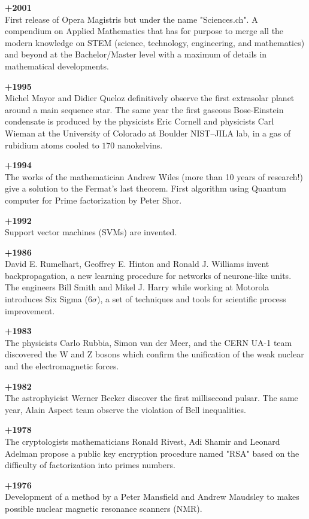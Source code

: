 \textbf{+2001}\\
First release of Opera Magistris but under the name "Sciences.ch". A compendium on Applied Mathematics that has for purpose to merge all the modern knowledge on STEM (science, technology, engineering, and mathematics) and beyond at the Bachelor/Master level with a maximum of details in mathematical developments.

\textbf{+1995}\\
Michel Mayor and Didier Queloz definitively observe the first extrasolar planet around a main sequence star. The same year the first gaseous Bose-Einstein condensate is produced by the physicists Eric Cornell and physicists Carl Wieman at the University of Colorado at Boulder NIST–JILA lab, in a gas of rubidium atoms cooled to $170$ nanokelvins.

\textbf{+1994}\\
The works of the mathematician Andrew Wiles (more than 10 years of research!) give a solution to the Fermat's last theorem. First algorithm using Quantum computer for Prime factorization by Peter Shor.

\textbf{+1992}\\
Support vector machines (SVMs) are invented.

\textbf{+1986}\\
David E. Rumelhart, Geoffrey E. Hinton and Ronald J. Williams invent backpropagation, a new learning procedure for networks of neurone-like units. The engineers Bill Smith and Mikel J. Harry while working at Motorola introduces Six Sigma ($6\sigma$), a set of techniques and tools for scientific process improvement.

\textbf{+1983}\\
The physicists Carlo Rubbia, Simon van der Meer, and the CERN UA-1 team discovered the W and Z bosons which confirm the unification of the weak nuclear and the electromagnetic forces.

\textbf{+1982}\\
The astrophyicist Werner Becker discover the first millisecond pulsar. The same year, Alain Aspect team observe the violation of Bell inequalities.

\textbf{+1978}\\
The cryptologists mathematicians Ronald Rivest, Adi Shamir and Leonard Adelman propose a public key encryption procedure named "RSA" based on the difficulty of factorization into primes numbers.

\textbf{+1976}\\
Development of a method by a Peter Mansfield and Andrew Maudsley to makes possible nuclear magnetic resonance scanners (NMR).

